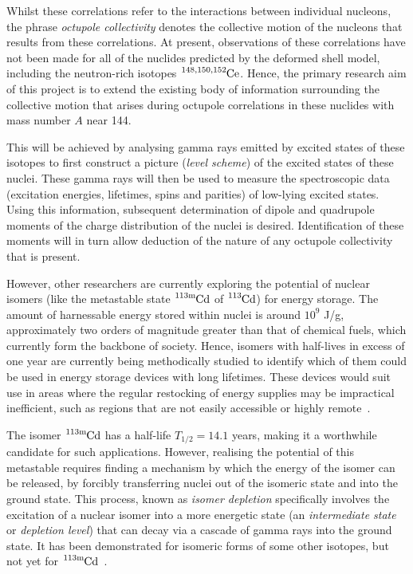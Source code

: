\documentclass[12pt,a4paper]{article}
\newcommand{\cdm}{\ce{^{113\text{m}}Cd}}
\begin{document}
\medskip
\noindent
Whilst these correlations refer to the interactions between individual nucleons, the phrase \textit{octupole collectivity} denotes the collective motion of the nucleons that results from these correlations.
At present, observations of these correlations have not been made for all of the nuclides predicted by the deformed shell model, including the neutron-rich isotopes $\ce{^{148,150,152}Ce}$.
Hence, the primary research aim of this project is to extend the existing body of information surrounding the collective motion that arises during octupole correlations in these nuclides with mass number $A$ near 144.

\medskip
\noindent
This will be achieved by analysing gamma rays emitted by excited states of these isotopes to first construct a picture (\textit{level scheme}) of the excited states of these nuclei. 
These gamma rays will then be used to measure the spectroscopic data (excitation energies, lifetimes, spins and parities) of low-lying excited states.
Using this information, subsequent determination of dipole and quadrupole moments of the charge distribution of the nuclei is desired.
Identification of these moments will in turn allow deduction of the nature of any octupole collectivity that is present.

\medskip
\noindent
However, other researchers are currently exploring the potential of nuclear isomers (like the metastable state $\ce{^{113\text{m}}Cd}$ of $\ce{^{113}Cd}$) for energy storage.
The amount of harnessable energy stored within nuclei is around $10^9$ J/g, approximately two orders of magnitude greater than that of chemical fuels, which currently form the backbone of society.
Hence, isomers with half-lives in excess of one year are currently being methodically studied to identify which of them could be used in energy storage devices with long lifetimes.
These devices would suit use in areas where the regular restocking of energy supplies may be impractical inefficient, such as regions that are not easily accessible or highly remote~\cite{shaffer_innovations_2018}.

\medskip
\noindent
The isomer $\cdm$ has a half-life $T_{1/2} = 14.1$ years, making it a worthwhile candidate for such applications.
However, realising the potential of this metastable requires finding a mechanism by which the energy of the isomer can be released, by forcibly transferring nuclei out of the isomeric state and into the ground state.
This process, known as \textit{isomer depletion} specifically involves the excitation of a nuclear isomer into a more energetic state (an \textit{intermediate state} or \textit{depletion level}) that can decay via a cascade of gamma rays into the ground state.
It has been demonstrated for isomeric forms of some other isotopes, but not yet for $\cdm$~\cite{shaffer_innovations_2018}.
\end{document}

